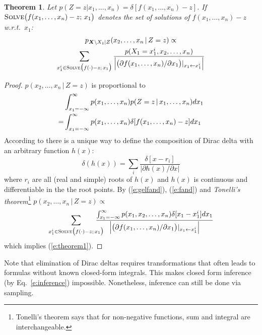 \documentclass{article}
\newtheorem{theorem}{Theorem}
\newcommand{\pr}{p}
\begin{document}
\begin{theorem} 
\label{theorem1}
Let {\footnotesize $\pr(Z\!=\!z | x_1, \ldots, x_n) = \delta[f(x_1, \ldots, x_n)-z]$}.
If {\footnotesize$\textsc{Solve}\big( f(x_1, \ldots, x_n) - z ; \, x_1 \big)$} denotes the set of solutions of 
$f(x_1, \ldots, x_n)-z$ w.r.t.\ $x_1$:
\begin{multline}
\label{e:theorem1}
p_{\boldsymbol{X}\backslash X_1 | Z}(x_2, \ldots, x_n \,|\, Z=z) \propto \\
\sum_{x_1^i \in \textsc{Solve}\big( f(\cdot) - z ; \, x_1 \big)} 
\frac{p(X_1=x_1^i, x_2, \ldots, x_n)}
{\Big|\big(\partial f(x_1, \ldots, x_n) / \partial x_1 \big)|_{x_1 \leftarrow x_1^i} \Big|}
\end{multline}
\end{theorem}
\begin{proof}
$p(x_2, \ldots, x_n \,|\, Z=z)$ is proportional to
\begin{align}
%
%
%
&\int_{x_1=-\infty}^{\infty}p(x_1, \ldots, x_n)p(Z=z \,|\, x_1, \ldots, x_n) dx_1 \notag\\
%
=&\int_{x_1=-\infty}^{\infty}p(x_1, \ldots, x_n)
\delta[f(x_1, \ldots, x_n) - z] dx_1 
\label{e:fand}
\end{align}
According to \cite{gel1964generalized}
there is a unique way to define the composition of Dirac delta with 
an arbitrary function $h(x)$:
\begin{equation}
\label{e:gelfand}
\delta(h(x)) = \sum_{i} \frac{\delta[x - r_i]}{|\partial h(x)/\partial x|}
\end{equation}
where $r_i$ are all (real and simple) roots of $h(x)$ and $h(x)$ is continuous and differentiable in the the root points. By (\ref{e:gelfand}), (\ref{e:fand}) and 
\emph{Tonelli's theorem}\footnote{Tonelli's theorem says that for non-negative functions, sum and integral are interchangeable.} 
$\pr(x_2, \ldots, x_n \,|\, Z = z) \propto$
\begin{equation*}
\sum_{x_1^i \in \textsc{Solve}\big( f(\cdot) - z ; \, x_1 \big)} \!\!\!\!\!\!\!\!
\frac{\int_{x_1 = -\infty}^{\infty} p(x_1, x_2, \ldots, x_n)  \delta[x_1 - x_1^i] d x_1}
{\Big|\big(\partial f(x_1, \ldots, x_n) / \partial x_1 \big)|_{x_1 \leftarrow x_1^i} \Big|}
\end{equation*}
which implies (\ref{e:theorem1}).
\end{proof}
%
Note that elimination of Dirac deltas requires transformations 
that often leads to formulas without known closed-form integrals.
This makes closed form inference (by Eq.~\ref{e:inference}) impossible.
Nonetheless, inference can still be done via sampling.
\end{document}
